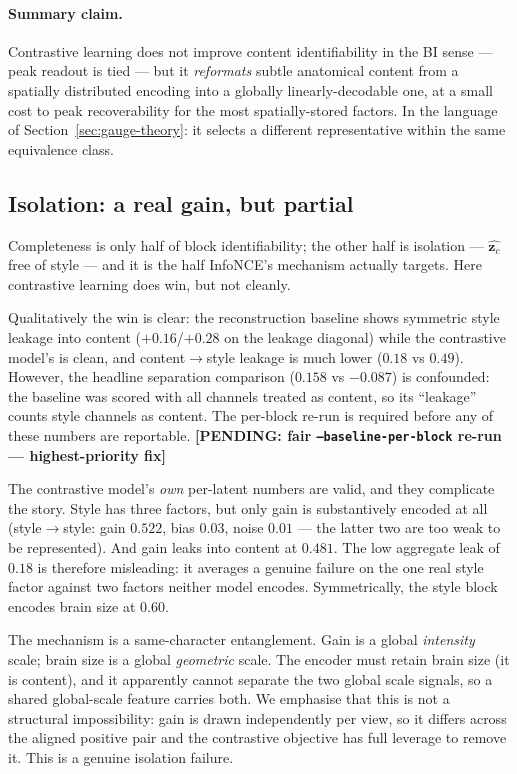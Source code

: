 \documentclass[11pt]{article}
\newcommand{\pending}[1]{{\color{red}\textbf{[PENDING: #1]}}}
\newcommand{\suspect}[1]{{\color{orange}#1}}
\newcommand{\zc}{\mathbf{z}_c}
\begin{document}
\paragraph{Summary claim.} Contrastive learning does not improve content
identifiability in the BI sense --- peak readout is tied --- but it
\emph{reformats} subtle anatomical content from a spatially distributed encoding
into a globally linearly-decodable one, at a small cost to peak recoverability
for the most spatially-stored factors. In the language of
Section~\ref{sec:gauge-theory}: it selects a different representative within the
same equivalence class.

\subsection{Isolation: a real gain, but partial}
\label{sec:isolation}

Completeness is only half of block identifiability; the other half is isolation
--- $\hat{\zc}$ free of style --- and it is the half InfoNCE's mechanism
actually targets. Here contrastive learning does win, but not cleanly.

Qualitatively the win is clear: the reconstruction baseline shows symmetric
style leakage into content ($+0.16$/$+0.28$ on the leakage diagonal) while the
contrastive model's is clean, and content$\to$style leakage is much lower
($0.18$ vs $0.49$). \suspect{However, the headline separation comparison
($0.158$ vs $-0.087$) is confounded: the baseline was scored with all channels
treated as content, so its ``leakage'' counts style channels as content. The
per-block re-run is required before any of these numbers are reportable.}
\pending{fair \texttt{--baseline-per-block} re-run --- highest-priority fix}

The contrastive model's \emph{own} per-latent numbers are valid, and they
complicate the story. Style has three factors, but only gain is substantively
encoded at all (style$\to$style: gain $0.522$, bias $0.03$, noise $0.01$ --- the
latter two are too weak to be represented). And gain leaks into content at
$\mathbf{0.481}$. The low aggregate leak of $0.18$ is therefore misleading: it
averages a genuine failure on the one real style factor against two factors
neither model encodes. Symmetrically, the style block encodes brain size at
$0.60$.

The mechanism is a same-character entanglement. Gain is a global \emph{intensity}
scale; brain size is a global \emph{geometric} scale. The encoder must retain
brain size (it is content), and it apparently cannot separate the two global
scale signals, so a shared global-scale feature carries both. We emphasise that
this is not a structural impossibility: gain is drawn independently per view, so
it differs across the aligned positive pair and the contrastive objective has
full leverage to remove it. This is a genuine isolation failure.
\end{document}
